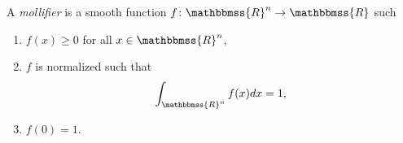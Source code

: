 \documentclass[12pt]{article}
\newcommand{\R}{\mathbbmss{R}}
\begin{document}
A \emph{mollifier} is a smooth function $f\colon \R^n \to \R$ such 
\begin{enumerate}
\item $f(x)\ge 0$ for all $x\in \R^n$,
\item $f$ is normalized such that 
$$
  \int_{\R^n} f(x) dx = 1,
$$
\item $f(0)=1$.
\end{enumerate}
\end{document}
